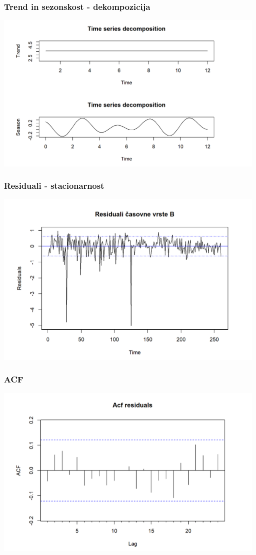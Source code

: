 \documentclass[10pt]{beamer}
\begin{document}
\begin{frame}
\frametitle{Trend in sezonskost - dekompozicija}
\includegraphics[width=1\textwidth]{seasonB.png}
\end{frame}

\begin{frame}
\frametitle{Residuali - stacionarnost}
\includegraphics[width=1\textwidth]{res_log_B.png}
\end{frame}


\begin{frame}
\frametitle{ACF}
\includegraphics[width=1\textwidth]{AcfB.png}
\end{frame}
\end{document}
